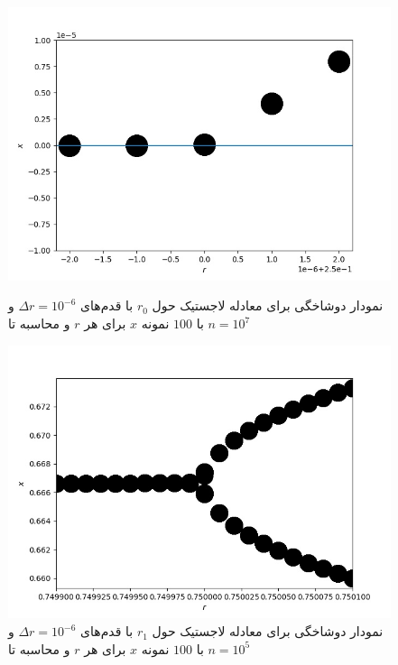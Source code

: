 \documentclass[11pt, a4paper]{article}
\begin{document}
\begin{figure}[h!]
  \centering
  \begin{minipage}[b]{0.42\textwidth}
    \includegraphics[width=\textwidth]{q4_0.249998_0.250002_5_10_10000000.jpg}
    \caption{نمودار دوشاخگی برای معادله لاجستیک حول $r_0$ با قدم‌های $\Delta r = 10^{-6}$ و با $100$ نمونه $x$ برای هر $r$ و محاسبه تا $n = 10^7$}
    \label{fig:q4_r_0}
  \end{minipage}
  \hfill
  \begin{minipage}[b]{0.42\textwidth}
    \includegraphics[width=\textwidth]{q4_0.7499_0.7501_21_100_100000.jpg}
    \caption{نمودار دوشاخگی برای معادله لاجستیک حول $r_1$ با قدم‌های $\Delta r = 10^{-6}$ و با $100$ نمونه $x$ برای هر $r$ و محاسبه تا $n = 10^5$}
    \label{fig:q4_r_1}
  \end{minipage}

\end{figure}
\end{document}

